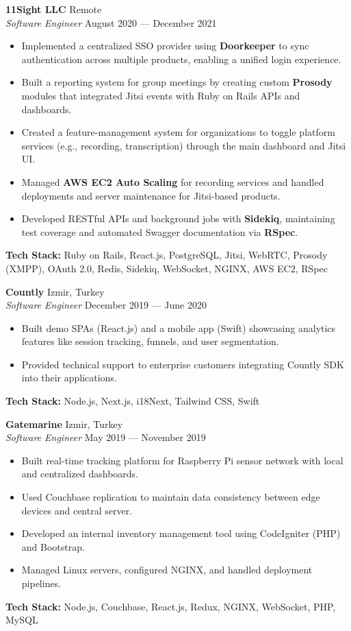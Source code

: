\documentclass[letterpaper,10pt]{article}
\newcommand{\skills}[1]{\textbf{#1}}
\begin{document}
\textbf{11Sight LLC} \hfill Remote \\
\textit{Software Engineer} \hfill August 2020 --- December 2021
\begin{itemize}[leftmargin=1.5em, label=\textbullet, noitemsep, topsep=2pt]
    \item Implemented a centralized SSO provider using \skills{Doorkeeper} to sync authentication across multiple products, enabling a unified login experience.
    \item Built a reporting system for group meetings by creating custom \skills{Prosody} modules that integrated Jitsi events with Ruby on Rails APIs and dashboards.
    \item Created a feature-management system for organizations to toggle platform services (e.g., recording, transcription) through the main dashboard and Jitsi UI.
    \item Managed \skills{AWS EC2 Auto Scaling} for recording services and handled deployments and server maintenance for Jitsi-based products.
    \item Developed RESTful APIs and background jobs with \skills{Sidekiq}, maintaining test coverage and automated Swagger documentation via \skills{RSpec}.
\end{itemize}
\textbf{Tech Stack:} Ruby on Rails, React.js, PostgreSQL, Jitsi, WebRTC, Prosody (XMPP), OAuth 2.0, Redis, Sidekiq, WebSocket, NGINX, AWS EC2, RSpec

\medskip

\textbf{Countly} \hfill Izmir, Turkey \\
\textit{Software Engineer} \hfill December 2019 --- June 2020
\begin{itemize}[leftmargin=1.5em, label=\textbullet, noitemsep, topsep=2pt]
    \item Built demo SPAs (React.js) and a mobile app (Swift) showcasing analytics features like session tracking, funnels, and user segmentation.
    \item Provided technical support to enterprise customers integrating Countly SDK into their applications.
\end{itemize}
\textbf{Tech Stack:} Node.js, Next.js, i18Next, Tailwind CSS, Swift

\medskip

\textbf{Gatemarine} \hfill Izmir, Turkey \\
\textit{Software Engineer} \hfill May 2019 --- November 2019
\begin{itemize}[leftmargin=1.5em, label=\textbullet, noitemsep, topsep=2pt]
    \item Built real-time tracking platform for Raspberry Pi sensor network with local and centralized dashboards.
    \item Used Couchbase replication to maintain data consistency between edge devices and central server.
    \item Developed an internal inventory management tool using CodeIgniter (PHP) and Bootstrap.
    \item Managed Linux servers, configured NGINX, and handled deployment pipelines.
\end{itemize}
\textbf{Tech Stack:} Node.js, Couchbase, React.js, Redux, NGINX, WebSocket, PHP, MySQL
\end{document}
